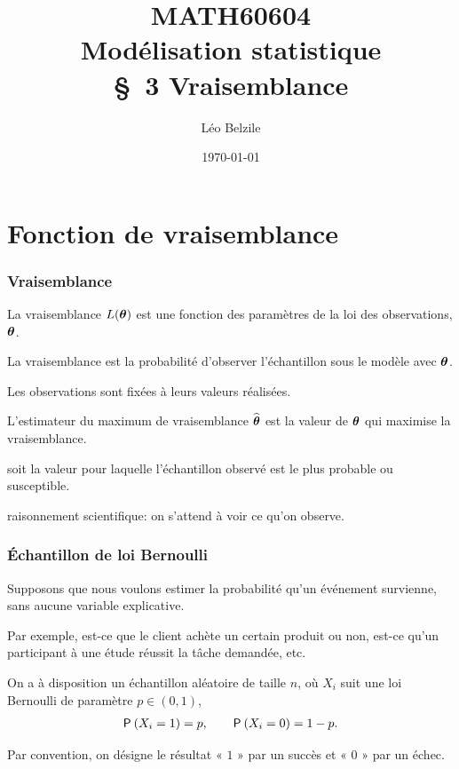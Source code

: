 \documentclass{beamer}
\title[\color{white}{MATH60604 \S~3 Vraisemblance}]{MATH60604 \\Modélisation statistique \\ \S~3 Vraisemblance}
\author{Léo Belzile}
\date{\today}
\institute{HEC Montréal\\
Département de sciences de la décision}
\date{}
\begin{document}
\frame{\titlepage}

\section{Fonction de vraisemblance}
\begin{frame}[fragile]
\frametitle{Vraisemblance}
\bi

\item La \alert{vraisemblance} $L(\bs{\theta})$ est une fonction des paramètres de la loi des observations, $\bs{\theta}$.
\bi \item La vraisemblance est la probabilité d'observer l'échantillon sous le modèle avec $\bs{\theta}$.
\item Les observations sont fixées à leurs valeurs réalisées.
\ei
\item L'estimateur du \alert{maximum de vraisemblance} $\hat{\bs{\theta}}$ est la valeur de $\bs{\theta}$ qui maximise la vraisemblance.
\bi \item soit la valeur pour laquelle l'échantillon observé est le plus probable ou susceptible.
\item raisonnement scientifique: on s'attend à voir ce qu'on observe.
\ei

\ei
\end{frame}
\begin{frame}[fragile]
\frametitle{Échantillon de loi Bernoulli}
\bi
\item  Supposons que nous voulons estimer la probabilité qu'un événement survienne, sans
aucune variable explicative.    
\item Par exemple, est-ce que le client achète un certain produit ou non, est-ce
qu'un participant à une étude réussit la tâche demandée, etc.

\item On a à disposition un échantillon aléatoire de taille $n$, où $X_i$ suit une loi Bernoulli de paramètre $p \in (0,1)$, 
\begin{align*}
\P{X_i=1}=p , \qquad \P{X_i=0}=1-p.
\end{align*}

\item Par convention, on désigne le résultat « $1$ » par un succès et « $0$ » par un échec.
\ei
\end{frame}
\end{document}
